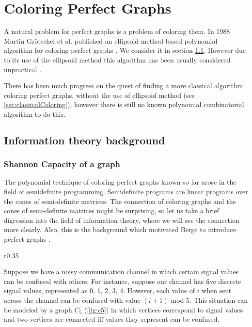 \section{Coloring Perfect Graphs}

A natural problem for perfect graphs is a problem of coloring them. In 1988 Martin Grötschel et al. published an ellipsoid-method-based polynomial algorithm for coloring perfect graphs \cite{Grtschel1993}. We consider it in section \cref{sec:ellipsoidMethod}. However due to its use of the ellipsoid method this algorithm has been usually considered unpractical \cite{coloringSquareFree,Chudnovsky2003, coloringArtemis}.

There has been much progress on the quest of finding a more classical algorithm coloring perfect graphs, without the use of ellipsoid method (see \cref{sec:classicalColoring}), however there is still no known polynomial combinatorial algorithm to do this. 

\subsection{Information theory background}
\label{sec:ellipsoidMethod}

\subsubsection{Shannon Capacity of a graph}
 
The polynomial technique of coloring perfect graphs known so far arose in the field of semidefinite programming. Semidefinite programs are linear programs over the cones of semi-definite matrices. The connection of coloring graphs and the cones of semi-definite matrices might be surprising, so let us take a brief digression into the field of information theory, where we will see the connection more clearly. Also, this is the background which motivated Berge to introduce perfect graphs \cite{Chudnovsky2003}.

\begin{wrapfigure}{r}{0.35\textwidth}
	
	\caption{Example noisy channel}%
  \label{fig:c5}
\end{wrapfigure}

Suppose we have a noisy communication channel in which certain signal values can be confused with others. For instance, suppose our channel has five discrete signal values, represented as 0, 1, 2, 3, 4. However, each value of $i$ when sent across the channel can be confused with value $(i \pm 1)$ mod $5$. This situation can be modeled by a graph $C_5$ (\cref{fig:c5}) in which vertices correspond to signal values and two vertices are connected iff values they represent can be confused.


